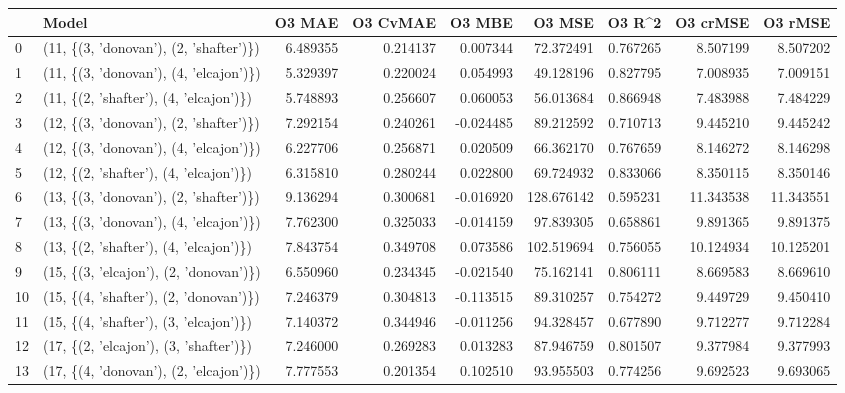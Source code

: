 \begin{tabular}{llrrrrrrr}
\toprule
{} &                                   Model &    O3 MAE &  O3 CvMAE &    O3 MBE &      O3 MSE &    O3 R\textasciicircum2 &   O3 crMSE &    O3 rMSE \\
\midrule
0  &  (11, \{(3, 'donovan'), (2, 'shafter')\}) &  6.489355 &  0.214137 &  0.007344 &   72.372491 &  0.767265 &   8.507199 &   8.507202 \\
1  &  (11, \{(3, 'donovan'), (4, 'elcajon')\}) &  5.329397 &  0.220024 &  0.054993 &   49.128196 &  0.827795 &   7.008935 &   7.009151 \\
2  &  (11, \{(2, 'shafter'), (4, 'elcajon')\}) &  5.748893 &  0.256607 &  0.060053 &   56.013684 &  0.866948 &   7.483988 &   7.484229 \\
3  &  (12, \{(3, 'donovan'), (2, 'shafter')\}) &  7.292154 &  0.240261 & -0.024485 &   89.212592 &  0.710713 &   9.445210 &   9.445242 \\
4  &  (12, \{(3, 'donovan'), (4, 'elcajon')\}) &  6.227706 &  0.256871 &  0.020509 &   66.362170 &  0.767659 &   8.146272 &   8.146298 \\
5  &  (12, \{(2, 'shafter'), (4, 'elcajon')\}) &  6.315810 &  0.280244 &  0.022800 &   69.724932 &  0.833066 &   8.350115 &   8.350146 \\
6  &  (13, \{(3, 'donovan'), (2, 'shafter')\}) &  9.136294 &  0.300681 & -0.016920 &  128.676142 &  0.595231 &  11.343538 &  11.343551 \\
7  &  (13, \{(3, 'donovan'), (4, 'elcajon')\}) &  7.762300 &  0.325033 & -0.014159 &   97.839305 &  0.658861 &   9.891365 &   9.891375 \\
8  &  (13, \{(2, 'shafter'), (4, 'elcajon')\}) &  7.843754 &  0.349708 &  0.073586 &  102.519694 &  0.756055 &  10.124934 &  10.125201 \\
9  &  (15, \{(3, 'elcajon'), (2, 'donovan')\}) &  6.550960 &  0.234345 & -0.021540 &   75.162141 &  0.806111 &   8.669583 &   8.669610 \\
10 &  (15, \{(4, 'shafter'), (2, 'donovan')\}) &  7.246379 &  0.304813 & -0.113515 &   89.310257 &  0.754272 &   9.449729 &   9.450410 \\
11 &  (15, \{(4, 'shafter'), (3, 'elcajon')\}) &  7.140372 &  0.344946 & -0.011256 &   94.328457 &  0.677890 &   9.712277 &   9.712284 \\
12 &  (17, \{(2, 'elcajon'), (3, 'shafter')\}) &  7.246000 &  0.269283 &  0.013283 &   87.946759 &  0.801507 &   9.377984 &   9.377993 \\
13 &  (17, \{(4, 'donovan'), (2, 'elcajon')\}) &  7.777553 &  0.201354 &  0.102510 &   93.955503 &  0.774256 &   9.692523 &   9.693065 \\

\end{tabular}
